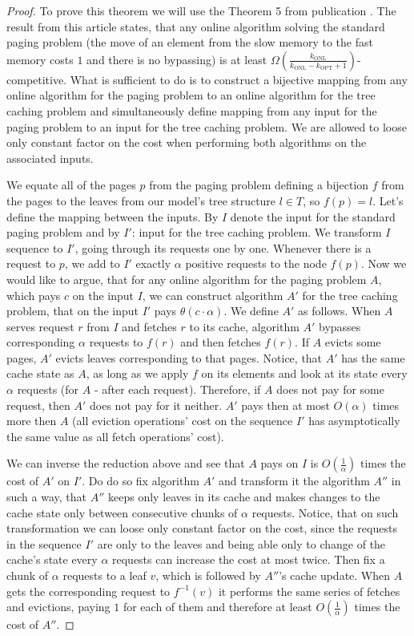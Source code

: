 \begin{proof}
To prove this theorem we will use
the Theorem 5 from publication \cite{tarjan}. The result from this article
states, that any online algorithm solving the standard paging problem (the move of an element from
the slow memory to the fast memory costs $1$ and there is no bypassing) is at least
$\Omega(\frac{k_{\mathrm{ONL}}}{k_{\mathrm{ONL}}- k_{\mathrm{OPT}} +
1})$-competitive. What is sufficient to do is to construct a bijective mapping
from any online algorithm for the paging problem to an online algorithm for the tree
caching problem and simultaneously define mapping from any input for the paging problem to an input
for the tree caching problem. We are allowed to loose only constant factor on the cost
when performing both algorithms on the associated inputs.

We equate all of the pages $p$ from the paging problem defining a bijection $f$ from the
pages to the leaves from our model's tree structure $l \in T$, so $f(p) = l$. Let's define the mapping between the
inputs. By $I$ denote the input for the standard paging problem and by $I'$: input for the tree
caching problem. We transform $I$ sequence to $I'$, going through its requests one by one.
Whenever there is a request to $p$, we add to $I'$ exactly $\alpha$ positive requests to the node
$f(p)$. Now we would like to argue, that for any online algorithm for the paging
problem $A$, which pays $c$ on the input $I$, we can construct algorithm $A'$ for the
tree caching problem, that on the input $I'$ pays $\theta(c \cdot \alpha)$. We
define $A'$ as follows.  When $A$ serves request $r$ from $I$ and fetches $r$ to
its cache, algorithm $A'$ bypasses corresponding $\alpha$ requests to $f(r)$ and then
fetches $f(r)$. If $A$ evicts some pages, $A'$ evicts leaves corresponding to that
pages. Notice, that $A'$ has the same cache state as $A$, as long as we apply
$f$ on its elements and look at its state every $\alpha$ requests (for $A$ - after each request).
Therefore, if $A$ does not pay for some request, then $A'$ does not
pay for it neither. $A'$ pays then at most $O(\alpha)$ times more then $A$ (all
eviction operations' cost on the sequence $I'$ has asymptotically the same value
as all fetch operations' cost).

We can inverse the reduction above and see that $A$ pays on $I$ is
$O(\frac{1}{\alpha})$ times the cost of $A'$ on $I'$. Do do so fix algorithm
$A'$ and transform it the algorithm $A''$ in such a way, that $A''$ keeps only leaves in its cache and
makes changes to the cache state only between consecutive chunks of $\alpha$ requests.
Notice, that on such transformation we can loose only constant factor on the cost, since the requests in the
sequence $I'$ are only to the leaves and being able only to change of the cache's state every $\alpha$ requests
can increase the cost at most twice. Then fix a chunk of $\alpha$ requests to a leaf $v$,
which is followed by $A''$'s cache update. When $A$ gets the corresponding request to $f^{-1}(v)$ 
it performs the same series of fetches and evictions, paying $1$ for each of them and therefore at least $O(\frac{1}{\alpha})$ times the cost of $A''$.\end{proof}
